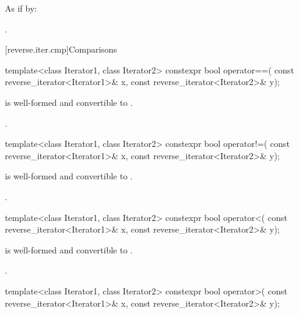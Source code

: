 \begin{itemdescr}
\pnum
\effects
As if by: 

\pnum
\returns
{}.
\end{itemdescr}

[reverse.iter.cmp]{Comparisons}

%
\begin{itemdecl}
template<class Iterator1, class Iterator2>
  constexpr bool operator==(
    const reverse_iterator<Iterator1>& x,
    const reverse_iterator<Iterator2>& y);
\end{itemdecl}

\begin{itemdescr}
\pnum
\constraints
{} is well-formed and
convertible to .

\pnum
\returns
{}.
\end{itemdescr}

%
\begin{itemdecl}
template<class Iterator1, class Iterator2>
  constexpr bool operator!=(
    const reverse_iterator<Iterator1>& x,
    const reverse_iterator<Iterator2>& y);
\end{itemdecl}

\begin{itemdescr}
\pnum
\constraints
{} is well-formed and
convertible to .

\pnum
\returns
{}.
\end{itemdescr}

%
\begin{itemdecl}
template<class Iterator1, class Iterator2>
  constexpr bool operator<(
    const reverse_iterator<Iterator1>& x,
    const reverse_iterator<Iterator2>& y);
\end{itemdecl}

\begin{itemdescr}
\pnum
\constraints
{} is well-formed and
convertible to .

\pnum
\returns
{}.
\end{itemdescr}

%
\begin{itemdecl}
template<class Iterator1, class Iterator2>
  constexpr bool operator>(
    const reverse_iterator<Iterator1>& x,
    const reverse_iterator<Iterator2>& y);
\end{itemdecl}

